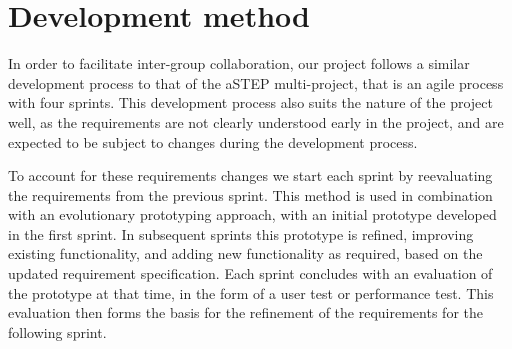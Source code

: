 \section{Development method} \label{sec:dev_method}
In order to facilitate inter-group collaboration, our project follows a similar development process to that of the aSTEP multi-project, that is an agile process with four sprints. This development process also suits the nature of the project well, as the requirements are not clearly understood early in the project, and are expected to be subject to changes during the development process. 

To account for these requirements changes we start each sprint by reevaluating the requirements from the previous sprint. This method is used in combination with an evolutionary prototyping approach, with an initial prototype developed in the first sprint. In subsequent sprints this prototype is refined, improving existing functionality, and adding new functionality as required, based on the updated requirement specification. Each sprint concludes with an evaluation of the prototype at that time, in the form of a user test or performance test. This evaluation then forms the basis for the refinement of the requirements for the following sprint. 


